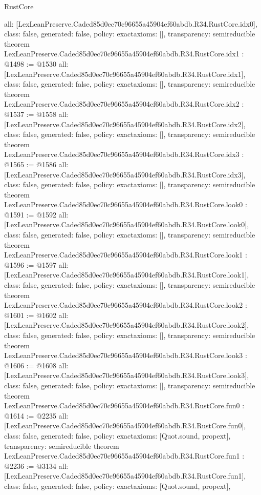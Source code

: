 \begin{lexlean}{RustCore}
\begin{coremodule}
{  all: [LexLeanPreserve.Caded85d0ec70c96655a45904ef60abdb.R34.RustCore.idx0],
  class: false,
  generated: false,
  policy: exact{axioms: []},
  transparency: semireducible
}
theorem LexLeanPreserve.Caded85d0ec70c96655a45904ef60abdb.R34.RustCore.idx1 : @1498 := @1530 {
  all: [LexLeanPreserve.Caded85d0ec70c96655a45904ef60abdb.R34.RustCore.idx1],
  class: false,
  generated: false,
  policy: exact{axioms: []},
  transparency: semireducible
}
theorem LexLeanPreserve.Caded85d0ec70c96655a45904ef60abdb.R34.RustCore.idx2 : @1537 := @1558 {
  all: [LexLeanPreserve.Caded85d0ec70c96655a45904ef60abdb.R34.RustCore.idx2],
  class: false,
  generated: false,
  policy: exact{axioms: []},
  transparency: semireducible
}
theorem LexLeanPreserve.Caded85d0ec70c96655a45904ef60abdb.R34.RustCore.idx3 : @1565 := @1586 {
  all: [LexLeanPreserve.Caded85d0ec70c96655a45904ef60abdb.R34.RustCore.idx3],
  class: false,
  generated: false,
  policy: exact{axioms: []},
  transparency: semireducible
}
theorem LexLeanPreserve.Caded85d0ec70c96655a45904ef60abdb.R34.RustCore.look0 : @1591 := @1592 {
  all: [LexLeanPreserve.Caded85d0ec70c96655a45904ef60abdb.R34.RustCore.look0],
  class: false,
  generated: false,
  policy: exact{axioms: []},
  transparency: semireducible
}
theorem LexLeanPreserve.Caded85d0ec70c96655a45904ef60abdb.R34.RustCore.look1 : @1596 := @1597 {
  all: [LexLeanPreserve.Caded85d0ec70c96655a45904ef60abdb.R34.RustCore.look1],
  class: false,
  generated: false,
  policy: exact{axioms: []},
  transparency: semireducible
}
theorem LexLeanPreserve.Caded85d0ec70c96655a45904ef60abdb.R34.RustCore.look2 : @1601 := @1602 {
  all: [LexLeanPreserve.Caded85d0ec70c96655a45904ef60abdb.R34.RustCore.look2],
  class: false,
  generated: false,
  policy: exact{axioms: []},
  transparency: semireducible
}
theorem LexLeanPreserve.Caded85d0ec70c96655a45904ef60abdb.R34.RustCore.look3 : @1606 := @1608 {
  all: [LexLeanPreserve.Caded85d0ec70c96655a45904ef60abdb.R34.RustCore.look3],
  class: false,
  generated: false,
  policy: exact{axioms: []},
  transparency: semireducible
}
theorem LexLeanPreserve.Caded85d0ec70c96655a45904ef60abdb.R34.RustCore.fun0 : @1614 := @2235 {
  all: [LexLeanPreserve.Caded85d0ec70c96655a45904ef60abdb.R34.RustCore.fun0],
  class: false,
  generated: false,
  policy: exact{axioms: [Quot.sound, propext]},
  transparency: semireducible
}
theorem LexLeanPreserve.Caded85d0ec70c96655a45904ef60abdb.R34.RustCore.fun1 : @2236 := @3134 {
  all: [LexLeanPreserve.Caded85d0ec70c96655a45904ef60abdb.R34.RustCore.fun1],
  class: false,
  generated: false,
  policy: exact{axioms: [Quot.sound, propext]},
}
\end{coremodule}
\end{lexlean}
